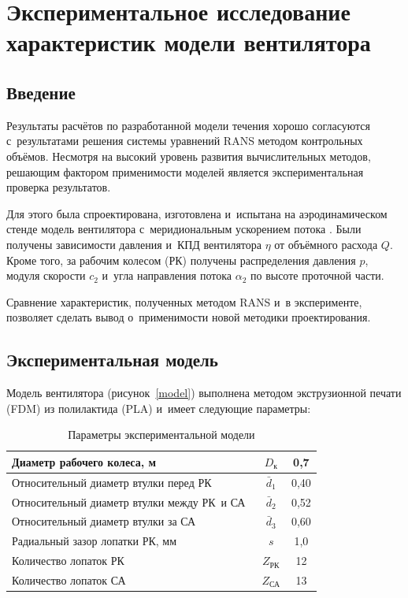 
\chapter{Экспериментальное исследование характеристик модели вентилятора}\label{ch:ch3}

\section{Введение}

Результаты расчётов по разработанной модели течения хорошо согласуются с~результатами решения системы уравнений RANS методом контрольных объёмов.
Несмотря на высокий уровень развития вычислительных методов, решающим фактором применимости моделей является экспериментальная проверка результатов.

Для этого была спроектирована, изготовлена и~испытана на аэродинамическом стенде модель вентилятора с~меридиональным ускорением потока \autocite{furashov2026}.
Были получены зависимости давления и~КПД вентилятора \(\eta\) от объёмного расхода \(Q\).
Кроме того, за рабочим колесом (РК) получены распределения давления \(p\), модуля скорости \(c_2\) и~угла направления потока \(\alpha_2\) по высоте проточной части.


Сравнение характеристик, полученных методом RANS и~в эксперименте, позволяет сделать вывод о~применимости новой методики проектирования.

\section{Экспериментальная модель}
Модель вентилятора (рисунок~\ref{model}) выполнена методом экструзионной печати (FDM) из полилактида (PLA) и~имеет следующие параметры:
\begin{table}[htb]
	\centering
	\caption{Параметры экспериментальной модели}
	\label{tab:ParamExModel}
	\begin{tabular}{l|c|c}
		Диаметр рабочего колеса, м~& \(D_\text{к}\) & 0,7\\
		\hline
		Относительный диаметр втулки перед РК~& \(\bar{d}_1\) & 0,40 \\
		\hline
		Относительный диаметр втулки между РК~и СА~& \(\bar{d}_2\) & 0,52 \\
		\hline
		Относительный диаметр втулки за СА & \(\bar{d}_3\) & 0,60 \\
		\hline
		Радиальный зазор лопатки РК, мм & \(s\) & 1,0 \\
		\hline
		Количество лопаток РК~& \(Z_\text{РК}\) & 12 \\
		\hline
		Количество лопаток СА~& \(Z_\text{СА}\) & 13
\end{tabular}
\end{table}

